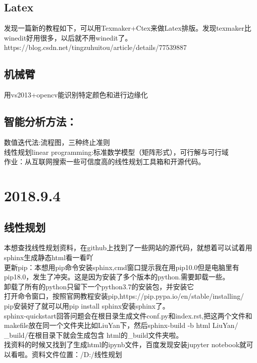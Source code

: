 \documentclass[UTF8]{ctexart}
\begin{document}
\subsection{Latex}
发现一篇新的教程如下，可以用Texmaker+Ctex来做Latex排版。发现texmaker比winedit好用很多，以后就不用winedit了。\\
https://blog.csdn.net/tingzuhuitou/article/details/77539887\\
\subsection{机械臂}
用vs2013+opencv能识别特定颜色和进行边缘化\\
\subsection{智能分析方法：}
数值迭代法:流程图，三种终止准则\\
线性规划linear programming:标准数学模型（矩阵形式），可行解与可行域\\
作业：从互联网搜索一些可信度高的线性规划工具箱和开源代码。\\
\section{2018.9.4}
\subsection{线性规划}
本想查找线性规划资料，在github上找到了一些网站的源代码，就想着可以试着用sphinx生成静态html看一看吖\\

更新pip：本想用pip命令安装sphinx,cmd窗口提示我在用pip10.0但是电脑里有pip18.0，发生了冲突。这是因为安装了多个版本的python.需要卸载一些。\\
卸载了所有的python只留下一个python3.7的安装包，并安装它\\
打开命令窗口，按照官网教程安装pip,https://pip.pypa.io/en/stable/installing/\\

pip安装好了就可以用pip install sphinx安装sphinx了。\\

sphinx-quickstart回答问题会在根目录生成文件conf.py和index.rst,把这两个文件和makefile放在同一个文件夹比如LiuYan下，然后sphinx-build -b html LiuYan/ _build/在根目录下就会生成包含
html的_build文件夹啦。\\

找资料的时候又找到了生成html的ipynb文件，百度发现安装jupyter notebook就可以看啦。资料文件位置：/D:/线性规划  \\
\end{document}
